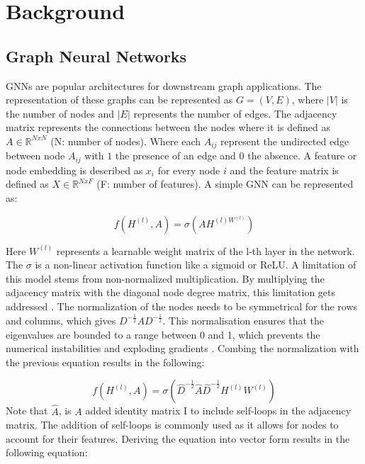 \documentclass[runningheads]{llncs}
\begin{document}
\section{Background}
\subsection{Graph Neural Networks}
GNNs are popular architectures for downstream graph applications. The representation of these graphs can be represented as $G = (V,E)$, where $\lvert V \rvert$ is the number of nodes and $ \lvert E \rvert$ represents the number of edges. The adjacency matrix represents the connections between the nodes where it is defined as $ A \in \mathbb{R}^{NxN}$ (N: number of nodes). Where each $A_{ij}$ represent the undirected edge between node $A_{ij}$ with $1$ the presence of an edge and $0$ the absence. A feature or node embedding is described as $x_{i}$ for every node $i$ and the feature matrix is defined as $ X \in \mathbb{R}^{NxF}$ (F: number of features). A simple GNN can be represented as: 

\begin{equation}
    f(H^{(l)}, A) = \sigma(AH^{(l)W^{(l)}})
\end{equation}

Here $W^{(l)}$ represents a learnable weight matrix of the l-th layer in the network. The $\sigma$ is a non-linear activation function like a sigmoid or ReLU. A limitation of this model stems from non-normalized multiplication. By multiplying the adjacency matrix with the diagonal node degree matrix, this limitation gets addressed \cite{Kipf2016}. The normalization of the nodes needs to be symmetrical for the rows and columns, which gives $D^{-\frac{1}{2}}AD^{-\frac{1}{2}}$. This normalisation ensures that the eigenvalues are bounded to a range between 0 and 1, which prevents the numerical instabilities and exploding gradients \cite{Kipf2016}.  Combing the normalization with the previous equation results in the following: 

\begin{equation}
f(H^{(l)}, A) = \sigma(\hat{D}^{-\frac{1}{2}}\hat{A}\hat{D}^{-\frac{1}{2}}H^{(l)}W^{(l)})
\end{equation}
Note that $\hat{A}$, is $A$ added identity matrix I to include self-loops in the adjacency matrix. The addition of self-loops is commonly used as it allows for nodes to account for their features. Deriving the equation into vector form results in the following equation: 
\end{document}
